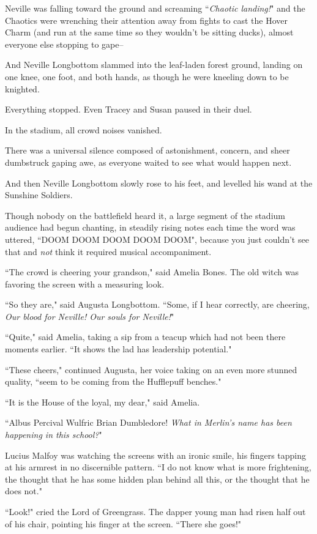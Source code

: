 Neville was falling toward the ground and screaming ``\emph{Chaotic landing!}" and the Chaotics were wrenching their attention away from fights to cast the Hover Charm (and run at the same time so they wouldn't be sitting ducks), almost everyone else stopping to gape\---

And Neville Longbottom slammed into the leaf-laden forest ground, landing on one knee, one foot, and both hands, as though he were kneeling down to be knighted.

Everything stopped. Even Tracey and Susan paused in their duel.

In the stadium, all crowd noises vanished.

There was a universal silence composed of astonishment, concern, and sheer dumbstruck gaping awe, as everyone waited to see what would happen next.

And then Neville Longbottom slowly rose to his feet, and levelled his wand at the Sunshine Soldiers.

Though nobody on the battlefield heard it, a large segment of the stadium audience had begun chanting, in steadily rising notes each time the word was uttered, ``DOOM DOOM DOOM DOOM DOOM", because you just couldn't see that and \emph{not} think it required musical accompaniment.

``The crowd is cheering your grandson," said Amelia Bones. The old witch was favoring the screen with a measuring look.

``So they are," said Augusta Longbottom. ``Some, if I hear correctly, are cheering, \emph{Our blood for Neville! Our souls for Neville!}"

``Quite," said Amelia, taking a sip from a teacup which had not been there moments earlier. ``It shows the lad has leadership potential."

``These cheers," continued Augusta, her voice taking on an even more stunned quality, ``seem to be coming from the Hufflepuff benches."

``It is the House of the loyal, my dear," said Amelia.

``Albus Percival Wulfric Brian Dumbledore! \emph{What in Merlin's name has been happening in this school?}"

Lucius Malfoy was watching the screens with an ironic smile, his fingers tapping at his armrest in no discernible pattern. ``I do not know what is more frightening, the thought that he has some hidden plan behind all this, or the thought that he does not."

``Look!" cried the Lord of Greengrass. The dapper young man had risen half out of his chair, pointing his finger at the screen. ``There she goes!"

